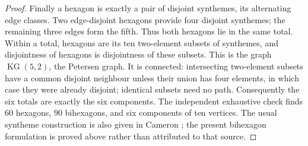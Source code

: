 \begin{proof}
Finally a hexagon is exactly a pair of disjoint synthemes, its alternating
edge classes. Two edge-disjoint hexagons provide four disjoint synthemes;
the remaining three edges form the fifth. Thus both hexagons lie in the
same total. Within a total, hexagons are its ten two-element subsets of
synthemes, and disjointness of hexagons is disjointness of these subsets.
This is the graph $\operatorname{KG}(5,2)$, the Petersen graph. It is
connected: intersecting two-element subsets have a common disjoint
neighbour unless their union has four elements, in which case they were
already disjoint; identical subsets need no path. Consequently the six
totals are exactly the six components. The independent exhaustive check
finds $60$ hexagons, $90$ bihexagons, and six components of ten vertices.
The usual syntheme construction is also given in Cameron
\cite[\S2, pp.2--3]{Cameron2015}; the present bihexagon formulation is
proved above rather than attributed to that source.
\end{proof}


